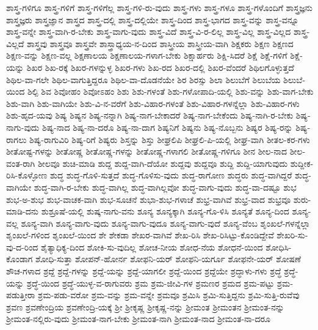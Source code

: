 {ಶಾಸ್ತ್ರ-ಗಳಿಗೂ
ಶಾಸ್ತ್ರ-ಗಳಿಗೆ
ಶಾಸ್ತ್ರ-ಗಳಿಗೆಲ್ಲ
ಶಾಸ್ತ್ರ-ಗಳಿ-ರು-ವುದು
ಶಾಸ್ತ್ರ-ಗಳು
ಶಾಸ್ತ್ರ-ಗಳೂ
ಶಾಸ್ತ್ರ-ಗಳೊಂದಿಗೆ
ಶಾಸ್ತ್ರಜ್ಞನು
ಶಾಸ್ತ್ರಜ್ಞರು
ಶಾಸ್ತ್ರಜ್ಞಾನ
ಶಾಸ್ತ್ರದ
ಶಾಸ್ತ್ರ-ದಲ್ಲಿ
ಶಾಸ್ತ್ರ-ದಲ್ಲಿಯೇ
ಶಾಸ್ತ್ರ-ದಿಂದ
ಶಾಸ್ತ್ರ-ಭಾಗದ
ಶಾಸ್ತ್ರ-ವನ್ನು
ಶಾಸ್ತ್ರ-ವನ್ನೂ
ಶಾಸ್ತ್ರ-ವನ್ನೇ
ಶಾಸ್ತ್ರ-ವಾಗಿ-ರ-ಬೇಕು
ಶಾಸ್ತ್ರ-ವಾಗು-ವುದು
ಶಾಸ್ತ್ರ-ವಿದೆ
ಶಾಸ್ತ್ರ-ವಿ-ರ-ಲಿಲ್ಲ
ಶಾಸ್ತ್ರ-ವಿಲ್ಲ
ಶಾಸ್ತ್ರ-ವಿಲ್ಲದ
ಶಾಸ್ತ್ರ-ವಿಲ್ಲದೆ
ಶಾಸ್ತ್ರವು
ಶಾಸ್ತ್ರವೂ
ಶಾಸ್ತ್ರವೇ
ಶಾಸ್ತ್ರಾಧ್ಯಯ-ನ-ದಿಂದ
ಶಾಸ್ತ್ರೀಯ
ಶಾಸ್ತ್ರೀಯ-ವಾಗಿ
ಶಿಕ್ಷಕರು
ಶಿಕ್ಷಣ
ಶಿಕ್ಷಣದ
ಶಿಕ್ಷಣ-ವನ್ನು
ಶಿಕ್ಷಣ-ವಲ್ಲ
ಶಿಕ್ಷಣಾಲಯ
ಶಿಕ್ಷಣಾಲಯ-ಗಳಾಗ-ಬೇಕು
ಶಿಕ್ಷಾರ್ಹರು
ಶಿಕ್ಷಿ-ಸಿದರೆ
ಶಿಕ್ಷೆ
ಶಿಕ್ಷೆ-ಗಳಿಗೆ
ಶಿಕ್ಷೆ-ಯನ್ನು
ಶಿಖರ
ಶಿಖ-ರಕ್ಕೆ
ಶಿಖರ-ಗಳನ್ನುಳ್ಳ
ಶಿಖರ-ಗಳು
ಶಿಖ-ರದ
ಶಿಖರ-ದಲ್ಲಿ
ಶಿಖರ-ವೆಂದರೆ
ಶಿಥಿಲಗೊಳ್ಳುತ್ತದೆ
ಶಿಥಿಲ-ವಾ-ಗಲೇ
ಶಿಥಿಲ-ವಾಗುತ್ತಿದ್ದರೂ
ಶಿಥಿಲ-ವಾ-ದೊಡನೆಯೇ
ಶಿರ
ಶಿರಸ್ಸು
ಶಿಲಾ
ಶಿಲುಬೆಗೆ
ಶಿಲುಬೆಯ
ಶಿಲುಬೆ-ಯಿಂದ
ಶಿಲ್ಪಿ
ಶಿವ
ಶಿವೋಹಂ
ಶಿವೋಽಹಂ
ಶಿಶು
ಶಿಶು-ಗಳಂತೆ
ಶಿಶು-ಗಳೋಪಾದಿ-ಯಲ್ಲಿ
ಶಿಶು-ವನ್ನು
ಶಿಶು-ವಾಗ-ಬೇಕು
ಶಿಶು-ವಾಗಿ
ಶಿಶು-ವಾಗಿಯೇ
ಶಿಶು-ವಿ-ನ-ವರೆಗೆ
ಶಿಶು-ವಿಹಾರ-ಗಳಂತೆ
ಶಿಶು-ವಿಹಾರ-ಗಳನ್ನೆಲ್ಲಾ
ಶಿಶು-ವಿಹಾರ-ಗಳು
ಶಿಶು-ಹೃದ-ಯವು
ಶಿಷ್ಯ
ಶಿಷ್ಯನ
ಶಿಷ್ಯ-ನನ್ನಾಗಿ
ಶಿಷ್ಯ-ನಾಗ-ಬೇಕಾದರೆ
ಶಿಷ್ಯ-ನಾಗ-ಬೇಕೆಂದು
ಶಿಷ್ಯ-ನಾಗಿ-ರ-ಬೇಕು
ಶಿಷ್ಯ-ನಾಗು-ವುದು
ಶಿಷ್ಯ-ನಾದ
ಶಿಷ್ಯ-ನಾ-ದರೊ
ಶಿಷ್ಯ-ನಾ-ದಾಗ
ಶಿಷ್ಯನಿಗೆ
ಶಿಷ್ಯನು
ಶಿಷ್ಯ-ನೊಬ್ಬನು
ಶಿಷ್ಯರ
ಶಿಷ್ಯ-ರನ್ನು
ಶಿಷ್ಯ-ರಾಗಲು
ಶಿಷ್ಯ-ರಾಗುವಿರಿ
ಶಿಷ್ಯ-ರಿಗೆ
ಶಿಷ್ಯರು
ಶಿಸ್ತನ್ನು
ಶಿಸ್ತು
ಶೀಘ್ರಲಿಪಿ
ಶೀಘ್ರಲಿ-ಪಿ-ಯಲ್ಲಿ
ಶೀಘ್ರ-ವಾಗಿ
ಶೀತಲ-ಕರ-ಗಳು
ಶೀತೋಷ್ಟ-ಗಳನ್ನು
ಶೀತೋಷ್ಣ
ಶೀತೋಷ್ಣ-ಗಳನ್ನು
ಶೀತೋಷ್ಣ-ಗಳಾಗಲಿ
ಶೀತೋಷ್ಣ-ಗಳಿಗೂ
ಶೀನ
ಶೀಲ-ನಾದ
ಶೀಲ-ವಂತ-ರಾಗಿ
ಶೀಲವೂ
ಶುಚಿ-ಮಾಡಿ
ಶುದ್ದ
ಶುದ್ದ-ವಾಗಿ-ದೆಯೋ
ಶುದ್ದವು
ಶುದ್ದವೂ
ಶುದ್ದಿ
ಶುದ್ದಿ-ಯಾಗುವುದು
ಶುದ್ದೀಕ-ರಿಸಿ-ಕೊಳ್ಳೋಣ
ಶುದ್ಧ
ಶುದ್ಧ-ಗೊಳಿ-ಸುತ್ತದೆ
ಶುದ್ಧ-ಗೊಳಿಸು-ವುದು
ಶುದ್ಧ-ರಾಗೋಣ
ಶುದ್ಧರು
ಶುದ್ಧ-ವಾಗಿದ್ದರೆ
ಶುದ್ಧ-ವಾಗಿಯೇ
ಶುದ್ಧ-ವಾಗಿ-ರ-ಬೇಕು
ಶುದ್ಧ-ವಾಗಿಲ್ಲ
ಶುದ್ಧ-ವಾಗಿಲ್ಲವೋ
ಶುದ್ಧ-ವಾಗು-ವುದು
ಶುದ್ಧ-ವಾ-ದಷ್ಟೂ
ಶುಭ
ಶುಭ-ಅ-ಶುಭ
ಶುಭ-ವಾಚಕ-ವಾಗಿ
ಶುಭ-ಸೂಚನೆ
ಶುಭಾ-ಶುಭ-ಗಳಾಚೆ
ಶುಭ್ರ-ವಾಗಿವೆ
ಶುಭ್ರ-ವಾದ
ಶುಭ್ರವೂ
ಶುರು-ಮಾಡಿ-ದನು
ಶುಶ್ರೂಷೆ-ಯಲ್ಲಿ
ಶುಷ್ಕ-ನಾಗು-ವನು
ಶೂನ್ಯ
ಶೂನ್ಯಕ್ಕಾಗಿ
ಶೂನ್ಯ-ಗೊ-ಳಿಸಿ
ಶೂನ್ಯತೆ
ಶೂನ್ಯ-ದಿಂದ
ಶೂನ್ಯ-ವಲ್ಲ
ಶೂನ್ಯ-ವಾಗಿ
ಶೂನ್ಯ-ವಾಗು-ವುದು
ಶೂನ್ಯ-ವಾಗು-ವುದೂ
ಶೂನ್ಯ-ವಾಗು-ವುದೆ
ಶೂನ್ಯ-ವೆಂಬ
ಶೃಂಖಲೆ-ಗಳನ್ನೆಲ್ಲಾ
ಶೃಂಖಲೆ-ಗಳಿಂದ
ಶೃಂಖಲೆ-ಯಿಂದ
ಶೇ
ಶೇಕಡಾ
ಶೇಖರ-ವಾಗಿವೆ
ಶೇಖ-ರಿಸಿ
ಶೇಖ-ರಿಸಿಟ್ಟು-ಕೊಂಡಿದ್ದೇವೆ
ಶೇಖರಿ-ಸು-ವು-ದ-ರಿಂದ
ಶೈತ್ಯಾಧಿಕ್ಯ-ದಿಂದ
ಶೋಕಿ-ಸು-ವುದಿಲ್ಲ
ಶೋಚ-ನೀಯ
ಶೋಧ-ನೆಯ
ಶೋಧನೆ-ಯಿಂದ
ಶೋಧಿಸಿ-ಕೊಂಡಾಗ
ಶೋಧಿ-ಸುತ್ತಾ
ಶೋಪನ್-ಹೋರ್ನ
ಶೋಫನಿ-ಯರ್
ಶೋಫನಿ-ಯರ್ಗೂ
ಶೋಫನೇ-ಯರ್
ಶೋಷಣೆ
ಶೌಚ-ಗಳಾದ
ಶ್ರದ್ದೆ
ಶ್ರದ್ದೆ-ಗಳನ್ನು
ಶ್ರದ್ದೆ-ಯನ್ನು
ಶ್ರದ್ದೆ-ಯಾಗಲೀ
ಶ್ರದ್ದೆ-ಯಿಂದ
ಶ್ರದ್ದೆಯೇ
ಶ್ರದ್ಧಾಳು-ಗಳು
ಶ್ರದ್ಧೆ
ಶ್ರದ್ಧೆ-ಯನ್ನು
ಶ್ರದ್ಧೆ-ಯಿಂದ
ಶ್ರದ್ಧೆ-ಯುಳ್ಳ-ವ-ರಾಗುವರು
ಶ್ರಮ
ಶ್ರಮ-ಜೀವಿ-ಗಳ
ಶ್ರಮಣರ
ಶ್ರಮದ
ಶ್ರಮ-ಪಟ್ಟು
ಶ್ರಮ-ಪಡುತ್ತೀರಾ
ಶ್ರಮ-ಪಡು-ವರೋ
ಶ್ರಮ-ವನ್ನು
ಶ್ರಮ-ವನ್ನೇ
ಶ್ರಮವೂ
ಶ್ರಮಿಸಿ
ಶ್ರಮಿ-ಸುತ್ತಿದ್ದನು
ಶ್ರಮಿ-ಸುತ್ತಿ-ರುವೆವು
ಶ್ರವಣ
ಶ್ರವಣೇಂದ್ರಿಯ
ಶ್ರವಣೇಂದ್ರಿ-ಯಕ್ಕೆ
ಶ್ರೀ
ಶ್ರೀಕೃಷ್ಣ
ಶ್ರೀಕೃಷ್ಣ-ನನ್ನು
ಶ್ರೀಮಂತ
ಶ್ರೀಮಂತನ
ಶ್ರೀಮಂತ-ನನ್ನು
ಶ್ರೀಮಂತ-ನಲ್ಲಿರು-ವುದು
ಶ್ರೀಮಂತ-ನಾಗ-ಬೇಕು
ಶ್ರೀಮಂತ-ನಾಗಿ
ಶ್ರೀಮಂತ-ನಾದ
ಶ್ರೀಮಂತ-ನಾ-ದರೂ
}
